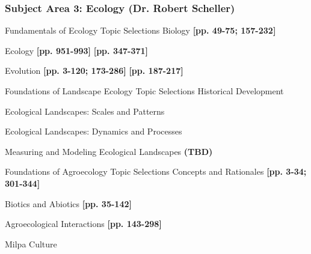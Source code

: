 \documentclass[12pt]{article}
\begin{document}
\newpage
\subsubsection{Subject Area 3: Ecology (Dr. Robert Scheller)}
\begin{outline}[enumerate]
\1 Fundamentals of Ecology 
\2 Topic Selections
\3 Biology
\4 \cite{curtis_biology_1983} \textbf{[pp. 49-75; 157-232]}

\3 Ecology
\4 \cite{curtis_biology_1983} \textbf{[pp. 951-993]}
\4 \cite{weier_botany:_1982} \textbf{[pp. 347-371]}
\4 \cite{odum_strategy_1969}
\4 \cite{hairston_community_1960}
\4 \cite{cardinale_biodiversity_2012}
\4 \cite {estes_trophic_2011}
\4 \cite{wiens_niche_2010}

\3 Evolution
\4 \cite{ehrlich_differentiation_1969}
\4 \cite{alleaume-benharira_geographical_2006}
\4 \cite{jay_gould_punctuated_1993}
\4 \cite{kauffman_origins_1993} \textbf{[pp. 3-120; 173-286]}
\4 \cite{beinhocker_origin_2007} \textbf{[pp. 187-217]}
\4 \cite{feng_epigenetic_2010}


\1 Foundations of Landscape Ecology
\2 Topic Selections
\3 Historical Development
\4 \cite{solnetsev_natural_1948}
\4 \cite{troll_geographic_1950}
\4 \cite{watt_pattern_1947}
\4 \cite{wiens_allerton_2008}

\3 Ecological Landscapes: Scales and Patterns
\4 \cite{turner_effects_1989}
\4 \cite{wu_effects_2004}
\4 \cite{legendre_spatial_1989}
\4 \cite{wiens_spatial_1989}

\3 Ecological Landscapes: Dynamics and Processes
\4 \cite{turner_disturbance_2010}
\4 \cite{turner_landscape_1989}
\4 \cite{peterjohn_nutrient_1984}
\4 \cite{wegner_movements_1979}
\4 \cite{walker_use_2010}
\4 \cite{wiens_population_1976}

\3 Measuring and Modeling Ecological Landscapes
\4 \cite{dale_spatial_2014} \textbf{(TBD)}
\4 \cite{naveh_biocybernetic_1987}
\4 \cite{lefkovitch_spatial_1985}
\4 \cite{scheller_ecological_2007}
\4 \cite{scheller_robert_m._landscape_2013}
\4 \cite{scheller_design_2007}


\1 Foundations of Agroecology
\2 Topic Selections
\3 Concepts and Rationales
\4 \cite{tilman_agricultural_2002}
\4 \cite{godfray_food_2010}
\4 \cite{gliessman_agroecology:_2015} \textbf{[pp. 3-34; 301-344]}
\4 \cite{wolfe_crop_2000}
\4 \cite{beus_conventional_1990}
\4 \cite{rosset_multiple_2000}
\4 \cite{thompson_agrarian_2010}

\3 Biotics and Abiotics
\4 \cite{schmidt_persistence_2011}
\4 \cite{gliessman_agroecology:_2015} \textbf{[pp. 35-142]}

\3 Agroecological Interactions
\4 \cite{gliessman_agroecology:_2015} \textbf{[pp. 143-298]}
\4 \cite{gianinazzi_impact_1994}
\4 \cite{schnitzer_soil_2011}
\4 \cite{smith_plant_2009}
\4 \cite {van_der_putten_plantsoil_2013}

\3 Milpa Culture
\4 \cite{jimenez-osornio_agrodiversidad_1999}
\4 \cite{toledo_uso_2008}
\4 \cite{benjamin_carbon_2001}
\4 \cite {dahlin_reconstructing_2005}
\end{outline}
\end{document}
